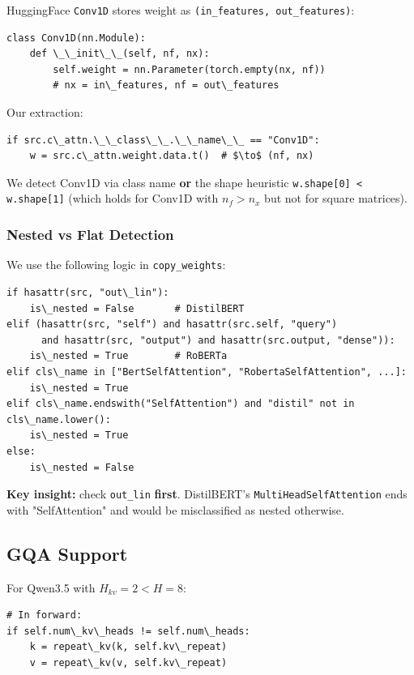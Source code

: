 HuggingFace \texttt{Conv1D} stores weight as \texttt{(in\_features, out\_features)}:

\begin{lstlisting}
class Conv1D(nn.Module):
    def \_\_init\_\_(self, nf, nx):
        self.weight = nn.Parameter(torch.empty(nx, nf))
        # nx = in\_features, nf = out\_features
\end{lstlisting}

Our extraction:

\begin{lstlisting}
if src.c\_attn.\_\_class\_\_.\_\_name\_\_ == "Conv1D":
    w = src.c\_attn.weight.data.t()  # $\to$ (nf, nx)
\end{lstlisting}

We detect Conv1D via class name \textbf{or} the shape heuristic 
\texttt{w.shape[0] \textless{} w.shape[1]} (which holds for Conv1D with $n_f > n_x$ but 
not for square matrices).

\subsubsection{Nested vs Flat Detection}

We use the following logic in \texttt{copy\_weights}:

\begin{lstlisting}
if hasattr(src, "out\_lin"):
    is\_nested = False       # DistilBERT
elif (hasattr(src, "self") and hasattr(src.self, "query")
      and hasattr(src, "output") and hasattr(src.output, "dense")):
    is\_nested = True        # RoBERTa
elif cls\_name in ["BertSelfAttention", "RobertaSelfAttention", ...]:
    is\_nested = True
elif cls\_name.endswith("SelfAttention") and "distil" not in cls\_name.lower():
    is\_nested = True
else:
    is\_nested = False
\end{lstlisting}

\textbf{Key insight:} check \texttt{out\_lin} \textbf{first}. DistilBERT's 
\texttt{MultiHeadSelfAttention} ends with "SelfAttention" and would be misclassified 
as nested otherwise.

\subsection{GQA Support}

For Qwen3.5 with $H_{kv} = 2 < H = 8$:

\begin{lstlisting}
# In forward:
if self.num\_kv\_heads != self.num\_heads:
    k = repeat\_kv(k, self.kv\_repeat)
    v = repeat\_kv(v, self.kv\_repeat)
\end{lstlisting}

